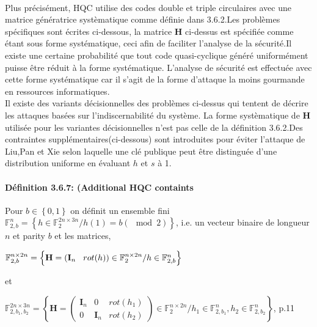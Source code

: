\documentclass[12pt,openany]{report}
\begin{document}
\paragraph{}
Plus précisément, HQC utilise des codes double et triple  circulaires avec une matrice génératrice systèmatique comme définie dans 3.6.2.Les problèmes spécifiques sont écrites ci-dessous, la matrice $\mathbf{H}$ ci-dessus est spécifiée comme étant sous forme systématique, ceci afin de faciliter l'analyse de la sécurité.Il existe une certaine probabilité que tout code quasi-cyclique généré uniformément puisse être réduit à la forme systématique. L'analyse de sécurité est effectuée avec cette forme systématique car il s'agit de la forme d'attaque la moins gourmande en ressources informatiques. \\
Il existe des variants décisionnelles des problèmes ci-dessus qui tentent de décrire les attaques basées sur l'indiscernabilité du système. La forme systèmatique de $\mathbf{H} $ utilisée pour les variantes décisionnelles n'est pas celle de la définition 3.6.2.Des contraintes supplémentaires(ci-dessous) sont introduites pour éviter l'attaque de Liu,Pan et Xie selon laquelle une clé publique peut être distinguée d'une distribution uniforme en évaluant $h$ et $s$ à 1.  
\paragraph{Définition 3.6.7: (Additional HQC containts \\ } 
Pour $ b\in \left\lbrace 0,1  \right\rbrace $ on définit un ensemble fini $\mathbb{F}_{2,b}^n=\left\lbrace h \in \mathbb{F}_2^{2n \times 3n} / h(1)=b(\mod 2) \right\rbrace $, i.e. un vecteur binaire de longueur $n$ et parity $b$ et  les matrices,
\begin{center}

$ \mathbb{F}_{2,b}^{n \times 2n}=\left\lbrace \mathbf{H}=\left( \mathbf{I}_n \hspace{0.3cm} rot(h)\right) \in \mathbb{F}_{2}^{n \times 2n} / h \in \mathbb{F}_{2,b}^{n}\right\rbrace $

\end{center}
 et 

\begin{center}

$ \mathbb{F}_{2,b_1,b_2}^{2n \times 3n}=\left\lbrace \mathbf{H}= 
    \begin{pmatrix}
   \mathbf{I}_n &0& rot(h_1)\\
    0&\mathbf{I}_n& rot(h_2)
   \end{pmatrix}
 \in \mathbb{F}_{2}^{n \times 2n} / h_1 \in \mathbb{F}_{2,b_1}^{n}, h_2 \in \mathbb{F}_{2,b_2}^{n}   \right\rbrace $\cite{melchor2020}, p.11

\end{center}
\end{document}
